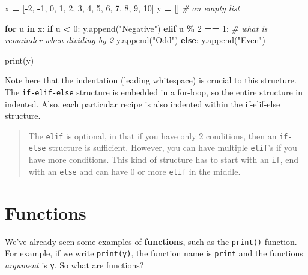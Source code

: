 \documentclass[
  letterpaper,
]{scrbook}
\newenvironment{Shaded}{\begin{snugshade}}{\end{snugshade}}
\newcommand{\BuiltInTok}[1]{#1}
\newcommand{\CommentTok}[1]{\textcolor[rgb]{0.56,0.35,0.01}{\textit{#1}}}
\newcommand{\ControlFlowTok}[1]{\textcolor[rgb]{0.13,0.29,0.53}{\textbf{#1}}}
\newcommand{\DecValTok}[1]{\textcolor[rgb]{0.00,0.00,0.81}{#1}}
\newcommand{\KeywordTok}[1]{\textcolor[rgb]{0.13,0.29,0.53}{\textbf{#1}}}
\newcommand{\NormalTok}[1]{#1}
\newcommand{\OperatorTok}[1]{\textcolor[rgb]{0.81,0.36,0.00}{\textbf{#1}}}
\newcommand{\StringTok}[1]{\textcolor[rgb]{0.31,0.60,0.02}{#1}}
\begin{document}
\begin{Shaded}
\begin{Highlighting}[]
\NormalTok{x }\OperatorTok{=}\NormalTok{ [}\OperatorTok{{-}}\DecValTok{2}\NormalTok{, }\OperatorTok{{-}}\DecValTok{1}\NormalTok{, }\DecValTok{0}\NormalTok{, }\DecValTok{1}\NormalTok{, }\DecValTok{2}\NormalTok{, }\DecValTok{3}\NormalTok{, }\DecValTok{4}\NormalTok{, }\DecValTok{5}\NormalTok{, }\DecValTok{6}\NormalTok{, }\DecValTok{7}\NormalTok{, }\DecValTok{8}\NormalTok{, }\DecValTok{9}\NormalTok{, }\DecValTok{10}\NormalTok{]}
\NormalTok{y }\OperatorTok{=}\NormalTok{ []  }\CommentTok{\# an empty list}

\ControlFlowTok{for}\NormalTok{ u }\KeywordTok{in}\NormalTok{ x:}
    \ControlFlowTok{if}\NormalTok{ u }\OperatorTok{\textless{}} \DecValTok{0}\NormalTok{:}
\NormalTok{        y.append(}\StringTok{"Negative"}\NormalTok{)}
    \ControlFlowTok{elif}\NormalTok{ u }\OperatorTok{\%} \DecValTok{2} \OperatorTok{==} \DecValTok{1}\NormalTok{:  }\CommentTok{\# what is remainder when dividing by 2}
\NormalTok{        y.append(}\StringTok{"Odd"}\NormalTok{)}
    \ControlFlowTok{else}\NormalTok{:}
\NormalTok{        y.append(}\StringTok{"Even"}\NormalTok{)}

\BuiltInTok{print}\NormalTok{(y)}
\end{Highlighting}
\end{Shaded}

Note here that the indentation (leading whitespace) is crucial to this structure. The \texttt{if-elif-else} structure is embedded in a for-loop, so the entire structure in indented. Also, each particular recipe is also indented within the if-elif-else structure.

\begin{quote}
The \texttt{elif} is optional, in that if you have only 2 conditions, then an \texttt{if-else} structure is sufficient. However, you can have multiple \texttt{elif}'s if you have more conditions. This kind of structure has to start with an \texttt{if}, end with an \texttt{else} and can have 0 or more \texttt{elif} in the middle.
\end{quote}

\hypertarget{functions}{%
\section{Functions}\label{functions}}

We've already seen some examples of \textbf{functions}, such as the \texttt{print()} function. For example, if we write \texttt{print(y)}, the function name is \texttt{print} and the functions \emph{argument} is \texttt{y}. So what are functions?
\end{document}
